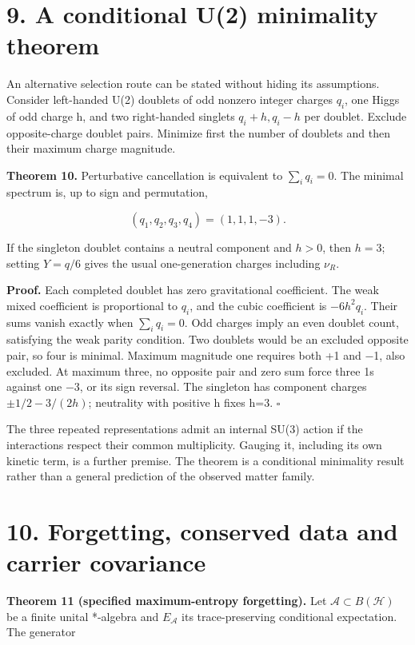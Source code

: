 \documentclass[
  11pt,
  a4paper,
]{article}
\begin{document}
\section{9. A conditional U(2) minimality theorem}\label{a-conditional-u2-minimality-theorem}

An alternative selection route can be stated without hiding its assumptions. Consider left-handed U(2) doublets of odd nonzero integer charges \(q_i\), one Higgs of odd charge h, and two right-handed singlets \(q_i+h,q_i-h\) per doublet. Exclude opposite-charge doublet pairs. Minimize first the number of doublets and then their maximum charge magnitude.

\textbf{Theorem 10.} Perturbative cancellation is equivalent to \(\sum_iq_i=0\). The minimal spectrum is, up to sign and permutation,

\[
 (q_1,q_2,q_3,q_4)=(1,1,1,-3).
\]

If the singleton doublet contains a neutral component and \(h>0\), then \(h=3\); setting \(Y=q/6\) gives the usual one-generation charges including \(\nu_R\).

\textbf{Proof.} Each completed doublet has zero gravitational coefficient. The weak mixed coefficient is proportional to \(q_i\), and the cubic coefficient is \(-6h^2q_i\). Their sums vanish exactly when \(\sum_iq_i=0\). Odd charges imply an even doublet count, satisfying the weak parity condition. Two doublets would be an excluded opposite pair, so four is minimal. Maximum magnitude one requires both +1 and −1, also excluded. At maximum three, no opposite pair and zero sum force three 1s against one −3, or its sign reversal. The singleton has component charges \(\pm1/2-3/(2h)\); neutrality with positive h fixes h=3. \(\square\)

The three repeated representations admit an internal SU(3) action if the interactions respect their common multiplicity. Gauging it, including its own kinetic term, is a further premise. The theorem is a conditional minimality result rather than a general prediction of the observed matter family.

\section{10. Forgetting, conserved data and carrier covariance}\label{forgetting-conserved-data-and-carrier-covariance}

\textbf{Theorem 11 (specified maximum-entropy forgetting).} Let \(\mathcal A\subset B(\mathcal H)\) be a finite unital *-algebra and \(E_{\mathcal A}\) its trace-preserving conditional expectation. The generator
\end{document}
